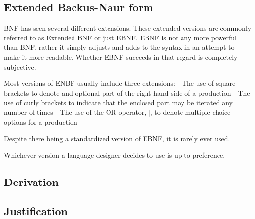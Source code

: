 
\subsection{Extended Backus-Naur form}

BNF has seen several different extensions.
These extended versions are commonly referred to as Extended BNF or just EBNF.
EBNF is not any more powerful than BNF, rather it simply adjusts and adds to the syntax in an attempt to make it more readable.
Whether EBNF succeeds in that regard is completely subjective.

Most versions of ENBF usually include three extensions:
- The use of square brackets to denote and optional part of the right-hand side of a production
- The use of curly brackets to indicate that the enclosed part may be iterated any number of times
- The use of the OR operator, |, to denote multiple-choice options for a production

Despite there being a standardized version of EBNF, it is rarely ever used.

Whichever version a language designer decides to use is up to preference.

\subsection{Derivation}


\subsection{Justification}
